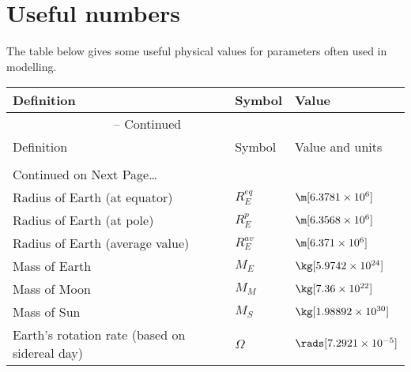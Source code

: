 \chapter{Useful numbers}

The table below gives some useful physical values for parameters often used in modelling.

\begin{center}
\begin{longtable}{lll}
\hline
Definition & Symbol & Value\\
\hline
\endfirsthead
%
\multicolumn{2}{c}{{\tablename} -- Continued} \\[0.5ex]
\hline
Definition & Symbol & Value and units\\
\hline
\endhead
  \\[0.5ex]
  \multicolumn{2}{l}{{Continued on Next Page\ldots}} \\
\endfoot
  \hline
\endlastfoot
%
Radius of Earth (at equator)                    &  $R_E^{eq}$   &  $\m[6.3781\times 10^6]$\\
Radius of Earth (at pole)                       &  $R_E^{p}$    &  $\m[6.3568\times 10^6]$\\
Radius of Earth (average value)                 &  $R_E^{av}$   &  $\m[6.371\times 10^6]$\\
Mass of Earth                                   &  $M_E$        &  $\kg[5.9742\times 10^{24}]$\\
Mass of Moon                                    &  $M_M$        &  $\kg[7.36\times 10^{22}]$\\
Mass of Sun                                     &  $M_S$        &  $\kg[1.98892\times 10^{30}]$\\
Earth's rotation rate (based on sidereal day)   &  $\Omega$     &  $\rads[7.2921\times 10^{-5}]$\\
\end{longtable}
\end{center}

